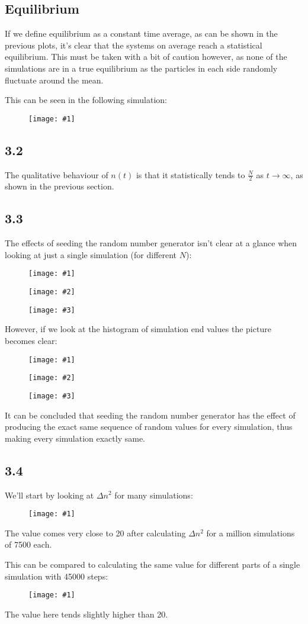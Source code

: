\documentclass[11pt]{article}
\newcommand{\triplefigure}[3]{
\begin{figure}[H]
  \centering
  \begin{minipage}{0.3\textwidth}
    \centering
    \texttt{[image: \#1]}
  \end{minipage}
  \begin{minipage}{0.3\textwidth}
    \centering
    \texttt{[image: \#2]}
  \end{minipage}
  \begin{minipage}{0.3\textwidth}
    \centering
    \texttt{[image: \#3]}
  \end{minipage}
\end{figure}
}
\newcommand{\singlefigure}[1]{
\begin{figure}[H]
  \centering
  \begin{minipage}{0.4\textwidth}
    \centering
    \texttt{[image: \#1]}
  \end{minipage}
\end{figure}
}
\begin{document}
\subsection*{Equilibrium}
If we define equilibrium as a constant time average, as can be shown in the previous plots, it's clear that the systems on average reach a statistical equilibrium.
This must be taken with a bit of caution however, as none of the simulations are in a true equilibrium as the particles in each side randomly fluctuate around the mean.

This can be seen in the following simulation:
\singlefigure{./plots/3_1/80_study.png}

\subsection*{3.2}
The qualitative behaviour of $n(t)$ is that it statistically tends to $\frac{N}{2}$ as $t \rightarrow \infty$, as shown in the previous section.

\subsection*{3.3}
The effects of seeding the random number generator isn't clear at a glance when looking at just a single simulation (for different $N$): 
\triplefigure{./plots/3_3/8_study.png}{./plots/3_3/64_study.png}{./plots/3_3/80_study.png}

However, if we look at the histogram of simulation end values the picture becomes clear:
\triplefigure{./plots/3_3/8_histogram.png}{./plots/3_3/64_histogram.png}{./plots/3_3/80_histogram.png}

It can be concluded that seeding the random number generator has the effect of producing the exact same sequence of random values for every simulation, 
thus making every simulation exactly same.

\subsection*{3.4}
We'll start by looking at $\Delta n^2$ for many simulations:
\singlefigure{./plots/3_4/many.png}
The value comes very close to 20 after calculating $\Delta n^2$ for a million simulations of 7500 each.

This can be compared to calculating the same value for different parts of a single simulation with 45000 steps:
\singlefigure{./plots/3_4/single.png}
The value here tends slightly higher than 20.
\end{document}
